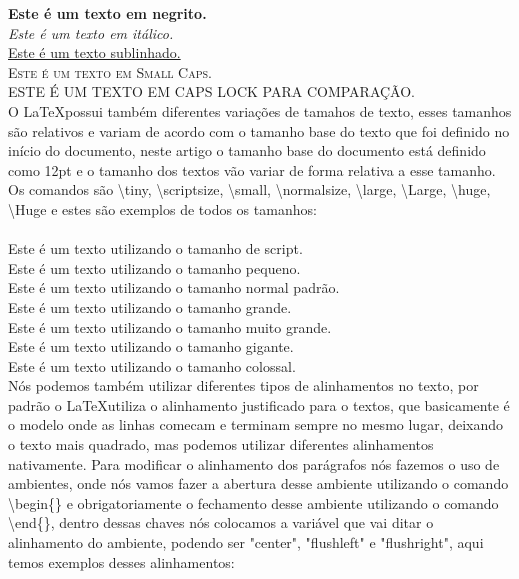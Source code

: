 \noindent \textbf{Este é um texto em negrito.}\\
\textit{Este é um texto em itálico.}\\
\underline{Este é um texto sublinhado.}\\
\textsc{Este é um texto em Small Caps.}\\
ESTE É UM TEXTO EM CAPS LOCK PARA COMPARAÇÃO.\\

O \LaTeX possui também diferentes variações de tamahos de texto, esses tamanhos são relativos e variam de acordo com o tamanho base do texto que foi definido no início do documento, neste artigo o tamanho base do documento está definido como 12pt e o tamanho dos textos vão variar de forma relativa a esse tamanho. Os comandos são \textbackslash tiny, \textbackslash scriptsize, \textbackslash small, \textbackslash normalsize, \textbackslash large, \textbackslash Large, \textbackslash huge, \textbackslash Huge e estes são exemplos de todos os tamanhos:\\

\\
{\scriptsize Este é um texto utilizando o tamanho de script.}\\
{\small Este é um texto utilizando o tamanho pequeno.}\\
{\normalsize Este é um texto utilizando o tamanho normal padrão.}\\
{\large Este é um texto utilizando o tamanho grande.}\\
{\Large Este é um texto utilizando o tamanho muito grande.}\\
{\huge Este é um texto utilizando o tamanho gigante.}\\
{\Huge Este é um texto utilizando o tamanho colossal.}\\

Nós podemos também utilizar diferentes tipos de alinhamentos no texto, por padrão o \LaTeX utiliza o alinhamento justificado para o textos, que basicamente é o modelo onde as linhas comecam e terminam sempre no mesmo lugar, deixando o texto mais quadrado, mas podemos utilizar diferentes alinhamentos nativamente. Para modificar o alinhamento dos parágrafos nós fazemos o uso de ambientes, onde nós vamos fazer a abertura desse ambiente utilizando o comando \textbackslash begin\{\} e obrigatoriamente o fechamento desse ambiente utilizando o comando \textbackslash end\{\}, dentro dessas chaves nós colocamos a variável que vai ditar o alinhamento do ambiente, podendo ser "center", "flushleft" e "flushright", aqui temos exemplos desses alinhamentos:\\

